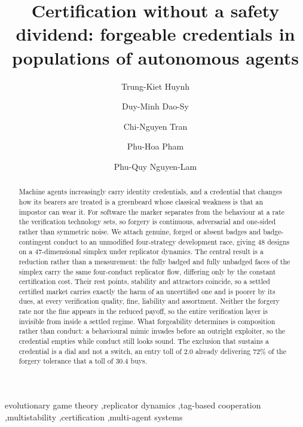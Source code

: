 \documentclass[preprint,12pt]{elsarticle}
\theoremstyle{plain}
\theoremstyle{definition}
\begin{document}
\begin{frontmatter}

\title{Certification without a safety dividend: forgeable credentials in
populations of autonomous agents}

\author[hcmus]{Trung-Kiet Huynh}

\author[hcmus]{Duy-Minh Dao-Sy}

\author[hcmus]{Chi-Nguyen Tran}

\author[hcmus]{Phu-Hoa Pham}

\author[hcmus]{Phu-Quy Nguyen-Lam}



\begin{abstract}
Machine agents increasingly carry identity credentials, and a credential that
changes how its bearers are treated is a greenbeard whose classical weakness is
that an impostor can wear it. For software the marker separates from the
behaviour at a rate the verification technology sets, so forgery is continuous,
adversarial and one-sided rather than symmetric noise. We attach genuine,
forged or absent badges and badge-contingent conduct to an unmodified
four-strategy development race, giving 48 designs on a 47-dimensional simplex
under replicator dynamics. The central result is a reduction rather than a
measurement: the fully badged and fully unbadged faces of the simplex carry the
same four-conduct replicator flow, differing only by the constant certification
cost. Their rest points, stability and attractors coincide, so a settled
certified market carries exactly the harm of an uncertified one and is poorer
by its dues, at every verification quality, fine, liability and assortment.
Neither the forgery rate nor the fine appears in the reduced payoff, so the
entire verification layer is invisible from inside a settled regime. What
forgeability determines is composition rather than conduct: a behavioural mimic
invades before an outright exploiter, so the credential empties while conduct
still looks sound. The exclusion that sustains a credential is a dial and not a
switch, an entry toll of $2.0$ already delivering $72\%$ of the forgery
tolerance that a toll of $30.4$ buys.
\end{abstract}

\begin{keyword}
evolutionary game theory \sep replicator dynamics \sep tag-based cooperation
\sep multistability \sep certification \sep multi-agent systems
\end{keyword}

\end{frontmatter}
\end{document}
